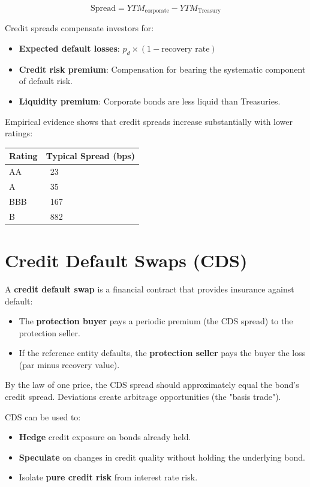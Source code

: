\documentclass[11pt,letterpaper]{report}
\begin{document}
$$\text{Spread} = YTM_{\text{corporate}} - YTM_{\text{Treasury}}$$

Credit spreads compensate investors for:

\begin{itemize}
  \item \textbf{Expected default losses}: $p_d \times (1 - \text{recovery rate})$
  \item \textbf{Credit risk premium}: Compensation for bearing the systematic component of default risk.
  \item \textbf{Liquidity premium}: Corporate bonds are less liquid than Treasuries.
\end{itemize}

Empirical evidence shows that credit spreads increase substantially with lower ratings:

\begin{center}
\begin{tabular}{ll}
\toprule
\textbf{Rating} & \textbf{Typical Spread (bps)} \\
\midrule
AA & ~23 \\
A & ~35 \\
BBB & ~167 \\
B & ~882 \\
\bottomrule
\end{tabular}
\end{center}


\section{Credit Default Swaps (CDS)}


A \textbf{credit default swap} is a financial contract that provides insurance against default:

\begin{itemize}
  \item The \textbf{protection buyer} pays a periodic premium (the CDS spread) to the protection seller.
  \item If the reference entity defaults, the \textbf{protection seller} pays the buyer the loss (par minus recovery value).
\end{itemize}

By the law of one price, the CDS spread should approximately equal the bond's credit spread.  Deviations create arbitrage opportunities (the "basis trade").

CDS can be used to:

\begin{itemize}
  \item \textbf{Hedge} credit exposure on bonds already held.
  \item \textbf{Speculate} on changes in credit quality without holding the underlying bond.
  \item Isolate \textbf{pure credit risk} from interest rate risk.
\end{itemize}
\end{document}
